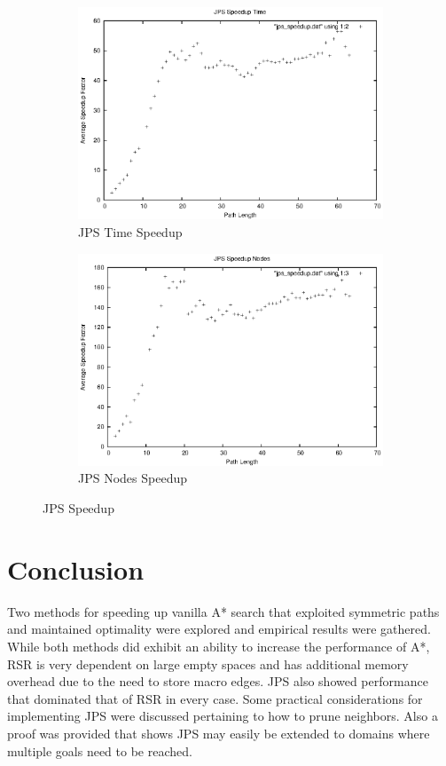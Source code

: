 \documentclass[12pt]{article}
\begin{document}
\begin{figure}
  \begin{subfigure}[b]{.5\linewidth}
    \includegraphics[scale=0.6]{figures/jps_speedup_time.eps}
    \caption{JPS Time Speedup}\label{jps_speedup:time}
  \end{subfigure}
  \begin{subfigure}[b]{.5\linewidth}
    \includegraphics[scale=0.6]{figures/jps_speedup_nodes.eps}
    \caption{JPS Nodes Speedup}\label{jps_speedup:nodes}
  \end{subfigure}
  \caption{JPS Speedup}\label{jps_speedup}
\end{figure}

\newpage

\section{Conclusion}
Two methods for speeding up vanilla A* search that exploited symmetric paths and maintained optimality were explored and empirical 
results were gathered. While both methods did exhibit an ability to increase the performance of A*, RSR is very dependent on large empty 
spaces and has additional memory overhead due to the need to store macro edges. JPS also showed performance that dominated that of RSR
in every case. Some practical considerations for implementing JPS were discussed pertaining to
how to prune neighbors. Also a proof was provided that shows JPS may easily be extended to domains where multiple goals need to be reached.




\end{document}
